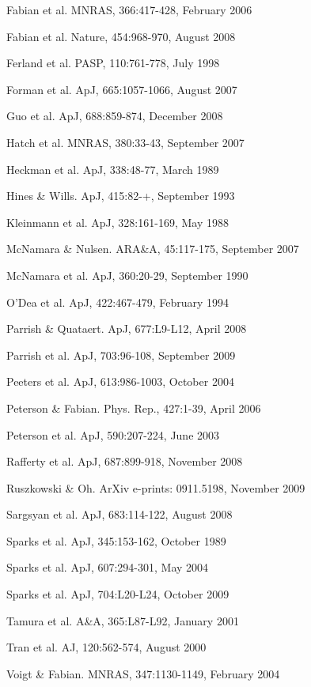 \documentclass[12pt]{article}
\begin{document}
\noindent [17] Fabian et al. MNRAS, 366:417-428, February 2006

\noindent [18] Fabian et al. Nature, 454:968-970, August 2008

\noindent [19] Ferland et al. PASP, 110:761-778, July 1998

\noindent [20] Forman et al. ApJ, 665:1057-1066, August 2007

\noindent [21] Guo et al. ApJ, 688:859-874, December 2008

\noindent [22] Hatch et al. MNRAS, 380:33-43, September 2007

\noindent [23] Heckman et al. ApJ, 338:48-77, March 1989

\noindent [24] Hines \& Wills. ApJ, 415:82-+, September 1993

\noindent [25] Kleinmann et al. ApJ, 328:161-169, May 1988

\noindent [26] McNamara \& Nulsen. ARA\&A, 45:117-175, September 2007

\noindent [27] McNamara et al. ApJ, 360:20-29, September 1990

\noindent [28] O'Dea et al. ApJ, 422:467-479, February 1994

\noindent [29] Parrish \& Quataert. ApJ, 677:L9-L12, April 2008

\noindent [30] Parrish et al. ApJ, 703:96-108, September 2009

\noindent [31] Peeters et al. ApJ, 613:986-1003, October 2004

\noindent [32] Peterson \& Fabian. Phys. Rep., 427:1-39, April 2006

\noindent [33] Peterson et al. ApJ, 590:207-224, June 2003

\noindent [34] Rafferty et al. ApJ, 687:899-918, November 2008

\noindent [35] Ruszkowski \& Oh. ArXiv e-prints: 0911.5198, November 2009

\noindent [36] Sargsyan et al. ApJ, 683:114-122, August 2008

\noindent [37] Sparks et al. ApJ, 345:153-162, October 1989

\noindent [38] Sparks et al. ApJ, 607:294-301, May 2004

\noindent [39] Sparks et al. ApJ, 704:L20-L24, October 2009

\noindent [40] Tamura et al. A\&A, 365:L87-L92, January 2001

\noindent [41] Tran et al. AJ, 120:562-574, August 2000

\noindent [42] Voigt \& Fabian. MNRAS, 347:1130-1149, February 2004
\end{document}
